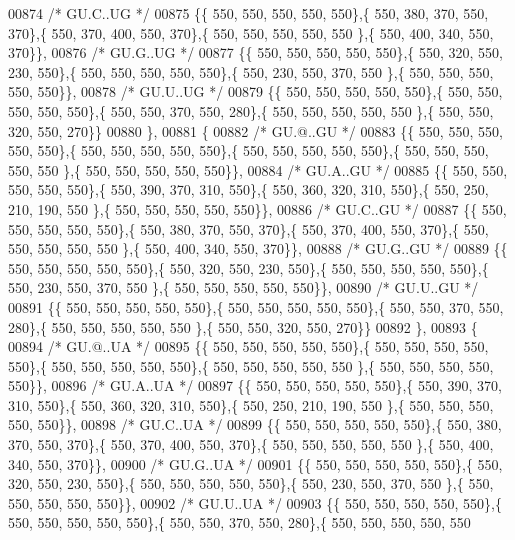\begin{DoxyCode}
00874 \textcolor{comment}{/* GU.C..UG */}
00875 \{\{ 550, 550, 550, 550, 550\},\{ 550, 380, 370, 550, 370\},\{ 550, 370, 400, 550, 370\},\{ 550, 550, 550, 550, 550
      \},\{ 550, 400, 340, 550, 370\}\},
00876 \textcolor{comment}{/* GU.G..UG */}
00877 \{\{ 550, 550, 550, 550, 550\},\{ 550, 320, 550, 230, 550\},\{ 550, 550, 550, 550, 550\},\{ 550, 230, 550, 370, 550
      \},\{ 550, 550, 550, 550, 550\}\},
00878 \textcolor{comment}{/* GU.U..UG */}
00879 \{\{ 550, 550, 550, 550, 550\},\{ 550, 550, 550, 550, 550\},\{ 550, 550, 370, 550, 280\},\{ 550, 550, 550, 550, 550
      \},\{ 550, 550, 320, 550, 270\}\}
00880 \},
00881 \{
00882 \textcolor{comment}{/* GU.@..GU */}
00883 \{\{ 550, 550, 550, 550, 550\},\{ 550, 550, 550, 550, 550\},\{ 550, 550, 550, 550, 550\},\{ 550, 550, 550, 550, 550
      \},\{ 550, 550, 550, 550, 550\}\},
00884 \textcolor{comment}{/* GU.A..GU */}
00885 \{\{ 550, 550, 550, 550, 550\},\{ 550, 390, 370, 310, 550\},\{ 550, 360, 320, 310, 550\},\{ 550, 250, 210, 190, 550
      \},\{ 550, 550, 550, 550, 550\}\},
00886 \textcolor{comment}{/* GU.C..GU */}
00887 \{\{ 550, 550, 550, 550, 550\},\{ 550, 380, 370, 550, 370\},\{ 550, 370, 400, 550, 370\},\{ 550, 550, 550, 550, 550
      \},\{ 550, 400, 340, 550, 370\}\},
00888 \textcolor{comment}{/* GU.G..GU */}
00889 \{\{ 550, 550, 550, 550, 550\},\{ 550, 320, 550, 230, 550\},\{ 550, 550, 550, 550, 550\},\{ 550, 230, 550, 370, 550
      \},\{ 550, 550, 550, 550, 550\}\},
00890 \textcolor{comment}{/* GU.U..GU */}
00891 \{\{ 550, 550, 550, 550, 550\},\{ 550, 550, 550, 550, 550\},\{ 550, 550, 370, 550, 280\},\{ 550, 550, 550, 550, 550
      \},\{ 550, 550, 320, 550, 270\}\}
00892 \},
00893 \{
00894 \textcolor{comment}{/* GU.@..UA */}
00895 \{\{ 550, 550, 550, 550, 550\},\{ 550, 550, 550, 550, 550\},\{ 550, 550, 550, 550, 550\},\{ 550, 550, 550, 550, 550
      \},\{ 550, 550, 550, 550, 550\}\},
00896 \textcolor{comment}{/* GU.A..UA */}
00897 \{\{ 550, 550, 550, 550, 550\},\{ 550, 390, 370, 310, 550\},\{ 550, 360, 320, 310, 550\},\{ 550, 250, 210, 190, 550
      \},\{ 550, 550, 550, 550, 550\}\},
00898 \textcolor{comment}{/* GU.C..UA */}
00899 \{\{ 550, 550, 550, 550, 550\},\{ 550, 380, 370, 550, 370\},\{ 550, 370, 400, 550, 370\},\{ 550, 550, 550, 550, 550
      \},\{ 550, 400, 340, 550, 370\}\},
00900 \textcolor{comment}{/* GU.G..UA */}
00901 \{\{ 550, 550, 550, 550, 550\},\{ 550, 320, 550, 230, 550\},\{ 550, 550, 550, 550, 550\},\{ 550, 230, 550, 370, 550
      \},\{ 550, 550, 550, 550, 550\}\},
00902 \textcolor{comment}{/* GU.U..UA */}
00903 \{\{ 550, 550, 550, 550, 550\},\{ 550, 550, 550, 550, 550\},\{ 550, 550, 370, 550, 280\},\{ 550, 550, 550, 550, 550

\end{DoxyCode}
